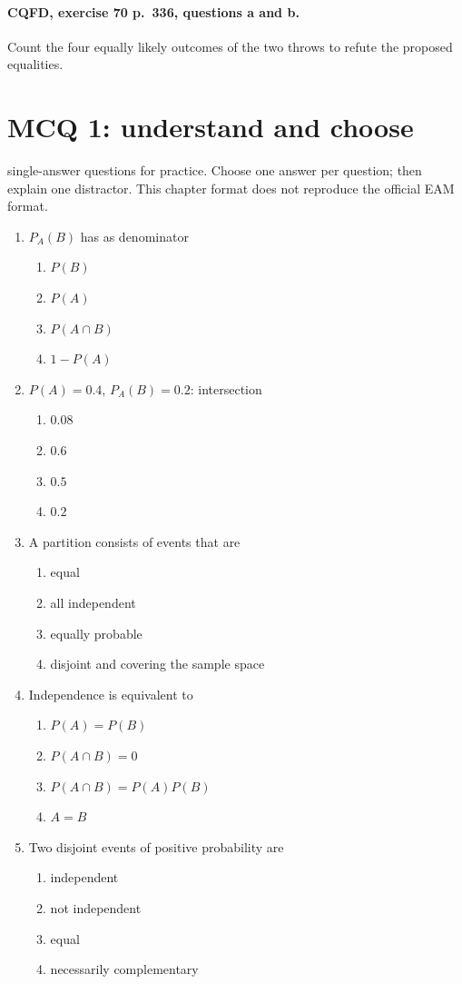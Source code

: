 \paragraph{CQFD, exercise 70 p.~336, questions a and b.}\label{C05-M2} Count the four equally likely outcomes of the two throws to refute the proposed equalities.
\begingroup\small
\mxnewpage\section*{MCQ 1: understand and choose}\label{C05-Q1}
 single-answer questions for practice. Choose one answer per question; then explain one distractor. This chapter format does not reproduce the official EAM format.
\begin{enumerate}
\item $P_A(B)$ has as denominator
\begin{enumerate}[label=\Alph*.,itemsep=2pt]
\item $P(B)$
\item $P(A)$
\item $P(A\cap B)$
\item $1-P(A)$
\end{enumerate}
\item $P(A)=\num{0,4}$, $P_A(B)=\num{0,2}$: intersection
\begin{enumerate}[label=\Alph*.,itemsep=2pt]
\item $\num{0,08}$
\item $\num{0,6}$
\item $\num{0,5}$
\item $\num{0,2}$
\end{enumerate}
\item A partition consists of events that are
\begin{enumerate}[label=\Alph*.,itemsep=2pt]
\item equal
\item all independent
\item equally probable
\item disjoint and covering the sample space
\end{enumerate}
\item Independence is equivalent to
\begin{enumerate}[label=\Alph*.,itemsep=2pt]
\item $P(A)=P(B)$
\item $P(A\cap B)=0$
\item $P(A\cap B)=P(A)P(B)$
\item $A=B$
\end{enumerate}
\item Two disjoint events of positive probability are
\begin{enumerate}[label=\Alph*.,itemsep=2pt]
\item independent
\item not independent
\item equal
\item necessarily complementary
\end{enumerate}
\end{enumerate}
